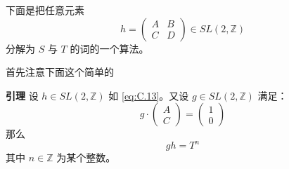下面是把任意元素
\begin{equation}
  h=\begin{pmatrix}
    A & B\\
    C & D
  \end{pmatrix}\in SL(2,\mathbb{Z})
  \tag{C.13}
  \label{eq:C.13}
\end{equation}
分解为 $S$ 与 $T$ 的词的一个算法。

首先注意下面这个简单的

\textbf{引理} 设 $h\in SL(2,\mathbb{Z})$ 如 \eqref{eq:C.13}。又设 $g\in SL(2,\mathbb{Z})$ 满足：
\begin{equation}
  g\cdot\begin{pmatrix}
    A\\
    C
  \end{pmatrix}=\begin{pmatrix}
    1\\
    0
  \end{pmatrix}
  \tag{C.14}
  \label{eq:C.14}
\end{equation}
那么
\begin{equation}
  gh=T^n
  \tag{C.15}
  \label{eq:C.15}
\end{equation}
其中 $n\in\mathbb{Z}$ 为某个整数。

